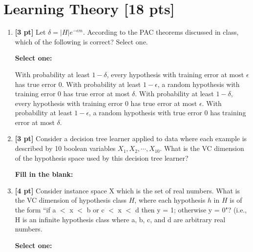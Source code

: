 \documentclass[11pt,addpoints,answers]{exam}
\begin{document}
\clearpage


\section{Learning Theory [18 pts]}
\begin{enumerate}
    \item 
    \textbf{[3 pt]} Let $\delta=|H|e^{-\epsilon m}$. According to the PAC theorems discussed in class, which of the following is correct? Select one.

    \textbf{Select one:}
    \begin{checkboxes}
        \choice With probability at least $1- \delta$, every hypothesis with training error at most $\epsilon$ has true error 0.
        \choice With probability at least $1-\epsilon$, a random hypothesis with training error 0 has true error at most $\delta$.
        \choice With probability at least $1-\delta$, every hypothesis with training error 0 has true error at most $\epsilon$.
        \choice With probability at least $1-\epsilon$, a random hypothesis with true error 0 has training error at most $\delta$.
    \end{checkboxes}
    
    
    \item \textbf{[3 pt]} Consider a decision tree learner applied to data where each example is described by 10 boolean variables $X_1, X_2, \cdots, X_{10}$. What is the VC dimension of the hypothesis space used by this decision tree learner?
    
    \textbf{Fill in the blank:}
    
    \begin{tcolorbox}[fit,height=1cm, width=4cm, blank, borderline={1pt}{-2pt},nobeforeafter]
    
    \end{tcolorbox}   
    
    
    \item \textbf{[4 pt]} Consider instance space X which is the set of real numbers. What is the VC dimension of hypothesis class $H$, where each hypothesis $h$ in $H$ is of the form  ``if a $<$ x $<$ b or c $<$ x $<$ d then y = 1; otherwise y = 0"?  (i.e., H is an infinite hypothesis class where a, b, c, and d are arbitrary real numbers.

    \textbf{Select one:}
    \begin{checkboxes}
    \end{checkboxes}
    


\end{enumerate}
\end{document}
